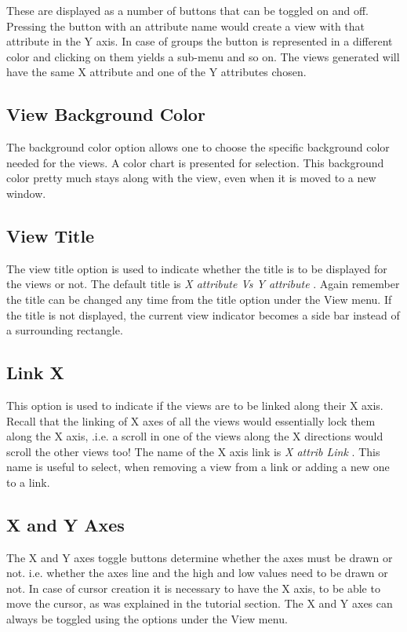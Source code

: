 These are displayed as a number of buttons that can be toggled on and
off. Pressing the button with an attribute name would create a view
with that attribute in the Y axis. In case of groups the button is
represented in a different color and clicking on them yields a sub-menu
and so on. The views generated will have the same X attribute and one
of the Y attributes chosen.

\subsection{View Background Color}

The background color option allows one to choose the specific
background color needed for the views.  A color chart is presented for
selection. This background color pretty much stays along with the
view, even when it is moved to a new window.

\subsection{View Title}

The view title option is used to indicate whether the title is to be
displayed for the views or not. The default title is {\em X attribute
Vs Y attribute} . Again remember the title can be changed any time
from the title option under the View menu. If the title is not
displayed, the current view indicator becomes a side bar instead of a
surrounding rectangle.

\subsection{Link X}

This option is used to indicate if the views are to be linked along
their X axis. Recall that the linking of X axes of all the views would
essentially lock them along the X axis, .i.e. a scroll in one of the
views along the X directions would scroll the other views too! The
name of the X axis link is {\em X attrib Link} . This name is useful
to select, when removing a view from a link or adding a new one to a
link.

\subsection{X and Y Axes}

The X and Y axes toggle buttons determine whether the axes must be
drawn or not. i.e. whether the axes line and the high and low values
need to be drawn or not. In case of cursor creation it is necessary to
have the X axis, to be able to move the cursor, as was explained in
the tutorial section. The X and Y axes can always be toggled using the
options under the View menu.

